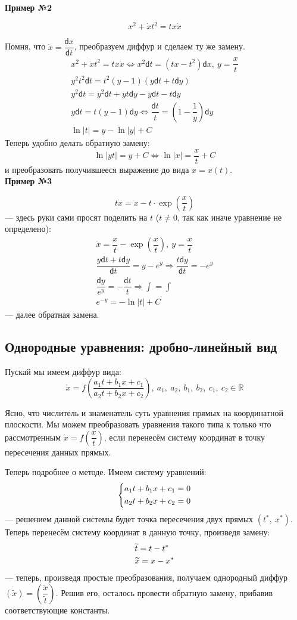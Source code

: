 \documentclass[a4paper,12pt]{article}
\newcommand{\R}{\mathbb{R}}
\renewcommand{\d}{\mathsf{d}}
\newcommand{\dx}{\dot{x}}
\newcommand{\wx}{\widetilde{x}}
\newcommand{\wt}{\widetilde{t}}
\newcommand{\ds}{\displaystyle}
\begin{document}
\textbf{Пример №2}

\[x^2 + \dx t^2 = tx\dx\]

Помня, что $\dx = \dfrac{\d x}{\d t}$, преобразуем диффур и сделаем ту же замену.
\begin{gather*}
	x^2 + \dx t^2 = tx\dx \iff x^2 \d t = (tx - t^2)\d x,\ y = \dfrac{x}{t}\\
	y^2t^2\d t = t^2(y - 1)(y\d t + t\d y)\\
	y^2\d t = y^2\d t + yt\d y - y\d t - t\d y\\
	y\d t = t(y - 1)\d y \iff 
	\dfrac{\d t}{t} = \left(1 - \dfrac{1}{y}\right)\d y\\
	\ln |t| = y - \ln |y| + C
\end{gather*}
Теперь удобно делать обратную замену:
\[\ln |yt| = y + C \iff \ln |x| = \dfrac{x}{t} + C\] и преобразовать получившееся выражение до вида $x = x(t)$.
\ \\

\textbf{Пример №3}

\[t\dx = x - t \cdot \exp(\dfrac{x}{t})\] --- здесь руки сами просят поделить на $t$ ($t \neq 0$, так как иначе уравнение не определено):
\begin{gather*}
	\dx = \dfrac{x}{t} - \exp(\dfrac{x}{t}),\ y = \dfrac{x}{t}\\
	\dfrac{y\d t + t\d y}{\d t} = y - e^y \Longrightarrow \dfrac{t\d y}{\d t} = - e^y\\
	\dfrac{\d y}{e^y} = -\dfrac{\d t}{t} \Longrightarrow \ds\int = \int\\
	e^{-y} = -\ln |t| + C
\end{gather*} --- далее обратная замена.

\subsection{Однородные уравнения: дробно-линейный вид}

Пускай мы имеем диффур вида:
\[\dx = f\left(\dfrac{a_1t + b_1x + c_1}{a_2t + b_2x + c_2}\right),\ a_1,\ a_2,\ b_1,\ b_2,\ c_1,\ c_2 \in \R\]

Ясно, что числитель и знаменатель суть уравнения прямых на координатной плоскости. Мы можем преобразовать уравнения такого типа к только что рассмотренным $\dx = f\left(\dfrac{x}{t}\right)$, если перенесём систему координат в точку пересечения данных прямых. 

Теперь подробнее о методе. Имеем систему уравнений:
\[\left\{\begin{gathered}
	a_1t + b_1x + c_1 = 0\hfill\\
	a_2t + b_2x + c_2 = 0\hfill
\end{gathered}\right.\] --- решением данной системы будет точка пересечения двух прямых $(t^*,\ x^*)$. Теперь перенесём систему координат в данную точку, произведя замену:
\[\begin{gathered}
	\wt = t - t^*\hfill\\
	\wx = x - x^*\hfill
\end{gathered}\] --- теперь, произведя простые преобразования, получаем однородный диффур $\dot{(\wx)} = \left(\dfrac{\wx}{\wt}\right)$. 	Решив его, осталось провести обратную замену, прибавив соответствующие константы.
\end{document}
